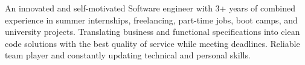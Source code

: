 

\begin{cvparagraph}

{ An innovated and self-motivated Software engineer with 3+ years of combined experience in summer internships, freelancing, part-time jobs, boot camps, and university projects. Translating business and functional specifications into clean code solutions with the best quality of service while meeting deadlines. Reliable team player and constantly updating technical and personal skills.} 
\end{cvparagraph}